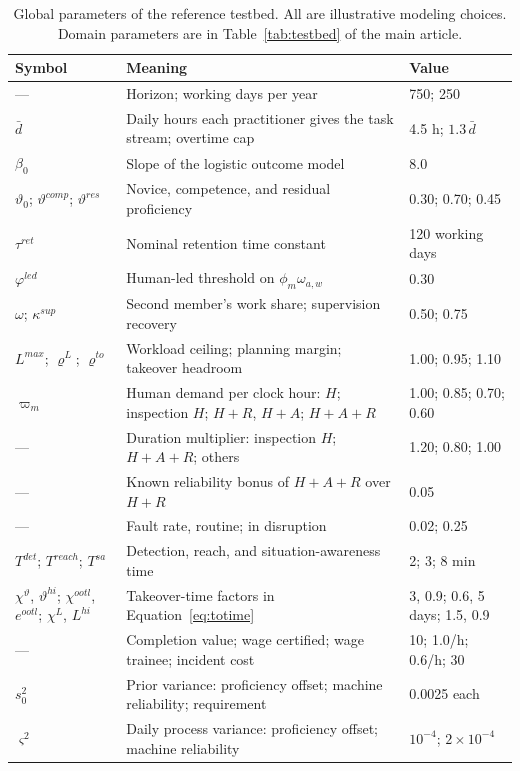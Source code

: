 \documentclass[utf8]{frontiers_suppmat}
\begin{document}
\begin{table}[!htbp]
	\caption{Global parameters of the reference testbed. All are illustrative modeling choices. Domain parameters are in Table~\ref{tab:testbed} of the main article.}
	\label{tab:app-params}
	\small
	\begin{tabularx}{\textwidth}{@{}lXl@{}}
		\toprule
		\textbf{Symbol} & \textbf{Meaning} & \textbf{Value}\\
		\midrule
		--- & Horizon; working days per year & 750; 250\\
		$\bar d$ & Daily hours each practitioner gives the task stream; overtime cap & 4.5 h; $1.3\,\bar d$\\
		$\beta_0$ & Slope of the logistic outcome model & 8.0\\
		$\vartheta_0$; $\vartheta^{comp}$; $\vartheta^{res}$ & Novice, competence, and residual proficiency & 0.30; 0.70; 0.45\\
		$\tau^{ret}$ & Nominal retention time constant & 120 working days\\
		$\varphi^{led}$ & Human-led threshold on $\phi_m\omega_{a,w}$ & 0.30\\
		$\omega$; $\kappa^{sup}$ & Second member's work share; supervision recovery & 0.50; 0.75\\
		$L^{max}$; $\varrho^{L}$; $\varrho^{to}$ & Workload ceiling; planning margin; takeover headroom & 1.00; 0.95; 1.10\\
		$\varpi_m$ & Human demand per clock hour: $H$; inspection $H$; $H{+}R$, $H{+}A$; $H{+}A{+}R$ & 1.00; 0.85; 0.70; 0.60\\
		--- & Duration multiplier: inspection $H$; $H{+}A{+}R$; others & 1.20; 0.80; 1.00\\
		--- & Known reliability bonus of $H{+}A{+}R$ over $H{+}R$ & 0.05\\
		--- & Fault rate, routine; in disruption & 0.02; 0.25\\
		$T^{det}$; $T^{reach}$; $T^{sa}$ & Detection, reach, and situation-awareness time & 2; 3; 8 min\\
		$\chi^{\vartheta}$, $\vartheta^{hi}$; $\chi^{ootl}$, $e^{ootl}$; $\chi^{L}$, $L^{hi}$ & Takeover-time factors in Equation~\eqref{eq:totime} & 3, 0.9; 0.6, 5 days; 1.5, 0.9\\
		--- & Completion value; wage certified; wage trainee; incident cost & 10; 1.0/h; 0.6/h; 30\\
		$s^2_0$ & Prior variance: proficiency offset; machine reliability; requirement & 0.0025 each\\
		$\varsigma^2$ & Daily process variance: proficiency offset; machine reliability & $10^{-4}$; $2\times10^{-4}$\\

\end{tabularx}
\end{table}
\end{document}
